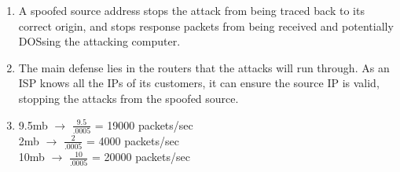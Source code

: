 \documentclass[12pt]{article}
\begin{document}
\begin{enumerate}
    \item A spoofed source address stops the attack from being traced back to its correct origin, and stops response packets from being received and potentially DOSsing the attacking computer.\\
    
    \item The main defense lies in the routers that the attacks will run through. As an ISP knows all the IPs of its customers, it can ensure the source IP is valid, stopping the attacks from the spoofed source.\\
    
    \item 9.5mb $\rightarrow$ {\Large $\frac{9.5}{.0005}$} = 19000 packets/sec\\[.4em]
    2mb $\rightarrow$ {\Large $\frac{2}{.0005}$} = 4000 packets/sec\\[.4em]
    10mb $\rightarrow$ {\Large $\frac{10}{.0005}$} = 20000 packets/sec\\[.4em]
    
    
\end{enumerate}
\end{document}
